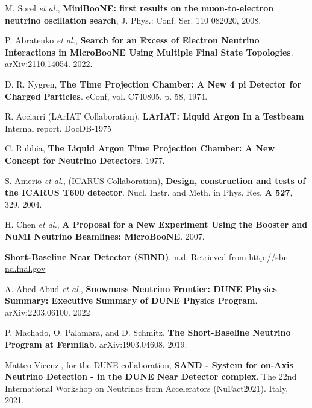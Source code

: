  M. Sorel \textit{et al.}, \textbf{MiniBooNE: first results on the muon-to-electron neutrino oscillation search}, J. Phys.: Conf. Ser. 110 082020, 2008.

 P. Abratenko \textit{et al.}, \textbf{Search for an Excess of Electron Neutrino Interactions in MicroBooNE Using Multiple Final State Topologies}. arXiv:2110.14054. 2022.

 D. R. Nygren, \textbf{The Time Projection Chamber: A New 4 pi Detector for Charged Particles}. eConf, vol. C740805, p. 58, 1974.

 R. Acciarri (LArIAT Collaboration), \textbf{LArIAT:
Liquid Argon In a Testbeam} Internal report. DocDB-1975

 C. Rubbia, \textbf{The Liquid Argon Time Projection Chamber: A New Concept for Neutrino Detectors}. 1977.

 S. Amerio \textit{et al.}, (ICARUS Collaboration), \textbf{Design, construction and tests of the ICARUS T600 detector}. Nucl. Instr. and Meth. in Phys. Res. \textbf{A 527}, 329. 2004.

 H. Chen \textit{et al.}, \textbf{A Proposal for a New Experiment Using the Booster and NuMI Neutrino Beamlines: MicroBooNE}. 2007.

 \textbf{Short-Baseline Near Detector (SBND)}. n.d. Retrieved from \href{http://sbn-nd.fnal.gov}{http://sbn-nd.fnal.gov}

 A. Abed Abud \textit{et al.}, \textbf{Snowmass Neutrino Frontier: DUNE Physics Summary: Executive Summary of DUNE Physics Program}. arXiv:2203.06100. 2022

 P. Machado, O. Palamara, and D. Schmitz, \textbf{The Short-Baseline Neutrino Program at Fermilab}. arXiv:1903.04608. 2019. 

 Matteo Vicenzi, for the DUNE collaboration, \textbf{SAND - System for on-Axis Neutrino Detection - in the DUNE Near Detector complex}. The 22nd International Workshop on Neutrinos from Accelerators (NuFact2021). Italy, 2021.
